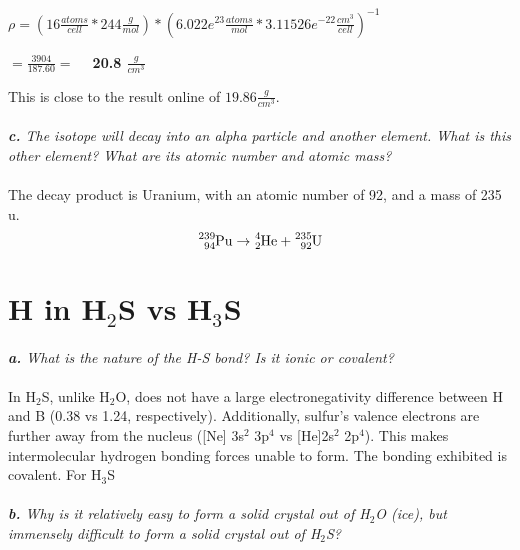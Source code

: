 \documentclass[letterpaper]{article}
\begin{document}
        $\rho = (16\frac{atoms}{cell} * 244 \frac{g}{mol}) * (6.022e^{23}\frac{atoms}{mol} * 3.11526e^{-22}\frac{cm^{3}}{cell})^{-1}$

        $ = \frac{3904}{187.60} =$ \textbf{~ 20.8 $\frac{g}{cm^{3}}$} 
        
        This is close to the result online of $19.86\frac{g}{cm^{3}}$.

    \paragraph{}
        \textit{
            \textbf{c.} 
            The isotope  will decay into an alpha particle  and another element.
            What is this other element? What are its atomic number and atomic mass?
        }

    \paragraph{}
        The decay product is Uranium, with an atomic number of 92, and a mass of 235 u.
        $$
        \ce{^{239}_{94}Pu} \rightarrow \ce{^{4}_{2}He} + \ce{^{235}_{92}U}
        $$
        
\section{H in H$_{2}$S vs H$_{3}$S}
    \paragraph{}
    \textit{
        \textbf{a.} 
        What is the nature of the H-S bond? Is it ionic or covalent?
        }
        
    \paragraph{}

        In H$_{2}$S, unlike H$_{2}$O, does not have a large electronegativity difference between H and B (0.38 vs 1.24, respectively).
        Additionally, sulfur's valence electrons are further away from the nucleus ([Ne] 3s$^{2}$ 3p$^{4}$ vs [He]2s$^{2}$ 2p$^{4}$).
        This makes intermolecular hydrogen bonding forces unable to form.
        The bonding exhibited is covalent.
        For H$_{3}$S

    \paragraph{}
    \textit{
        \textbf{b.} 
        Why is it relatively easy to form a solid crystal out of H$_{2}$O (ice), but immensely difficult to form a solid crystal out of H$_{2}$S?
        }
\end{document}
